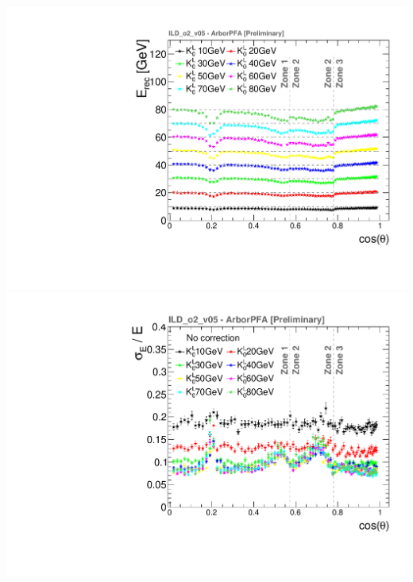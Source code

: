 \documentclass[8pt]{beamer}
\begin{document}
\begin{frame}
\begin{minipage}{0.5\linewidth}
\begin{center}
\begin{overprint}
           \centering \includegraphics[width=0.8\linewidth]{ERecLin.pdf} \\ \includegraphics[width=0.8\linewidth]{ERes_thesis.pdf}

\end{overprint}
\end{center}
\end{minipage}
\end{frame}
\end{document}
